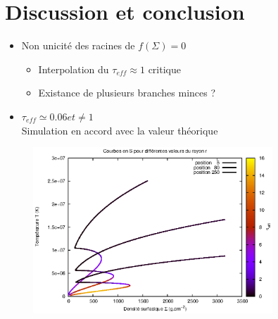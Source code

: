 \documentclass[french]{beamer}
\begin{document}
\section{Discussion et conclusion}
\begin{frame}

   \begin{itemize}
      \item Non unicité des racines de $f(\Sigma) = 0$
      \\
         \begin{itemize}
            \item Interpolation du $\tau_{eff} \approx 1$ critique
            \item Existance de plusieurs branches minces ? 
         \end{itemize}  
      \item $\tau_{eff} \simeq 0.06 et \neq 1$ 
      \\
Simulation en accord avec la valeur théorique
   \end{itemize}
\end{frame}


\begin{frame}

   \begin{figure}[htb!]
      \includegraphics[width=9cm]{figures/S_curves_tau.eps}
   \end{figure}
\end{frame}
\end{document}
